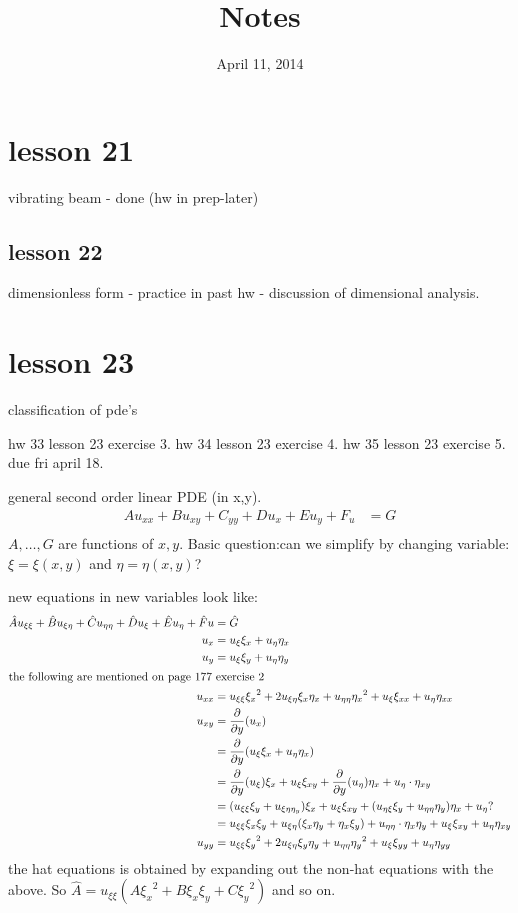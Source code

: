 \documentclass{article}
\begin{document}
\title{Notes}
\date{April 11, 2014}
\maketitle
\section*{lesson 21}
vibrating beam - done (hw in prep-later)

\subsection*{lesson 22}
dimensionless form - practice in past hw - discussion of dimensional analysis.

\section*{lesson 23}
classification of pde's

hw 33 lesson  23 exercise 3. hw 34 lesson 23 exercise 4. hw 35 lesson 23 exercise 5. due fri april 18.

general second order linear PDE (in x,y).
\begin{align*}
  Au_{xx}+Bu_{xy}+C_{yy}+Du_{x}+Eu_y+F_u&=G\\
\end{align*}
$A,\dots,G$ are functions of $x,y$. Basic question:can we simplify by changing variable:$\xi=\xi(x,y)$ and $\eta=\eta(x,y)$?

new equations in new variables look like:
\begin{align*}
  \hat{A}u_{\xi\xi}+\hat{B}u_{\xi\eta}+\hat{C}u_{\eta\eta}+\hat{D}u_{\xi}+\hat{E}u_{\eta}+\hat{F}u&=\hat{G}\\
  u_x&=u_\xi\xi_x+u_\eta\eta_x\\
  u_y&=u_\xi\xi_y+u_\eta\eta_y\\
  \intertext{the following are mentioned on page 177 exercise 2}
  u_{xx}&=u_{\xi\xi}{\xi_x}^2+2u_{\xi\eta}\xi_x\eta_x+u_{\eta\eta}{\eta_x}^2+u_\xi\xi_{xx}+u_\eta\eta_{xx}\\
  u_{xy}&=\frac{\partial }{\partial y}(u_x)\\
  &=\frac{\partial }{\partial y}(u_\xi\xi_x+u_\eta\eta_x)\\
  &=\frac{\partial }{\partial y}(u_\xi)\xi_x+u_\xi\xi_{xy}+\frac{\partial }{\partial y}(u_\eta)\eta_x+u_\eta\cdot\eta_{xy}\\
  &=(u_{\xi\xi}\xi_y+u_{\xi \eta\eta_y})\xi_x+u_\xi\xi_{xy}+(u_{\eta\xi}\xi_y+u_{\eta\eta}\eta_y)\eta_x+u_\eta?\\
  &=u_{\xi\xi}\xi_x\xi_y+u_{\xi\eta}(\xi_x\eta_y+\eta_x\xi_y)+u_{\eta\eta}\cdot\eta_x\eta_y+u_\xi\xi_{xy}+u_\eta\eta_{xy}\\
  u_{yy}&=u_{\xi\xi}{\xi_y}^2+2u_{\xi\eta}\xi_y\eta_y+u_{\eta\eta}{\eta_y}^2+u_\xi\xi_{yy}+u_\eta\eta_{yy}\\
\end{align*}
the hat equations is obtained by expanding out the non-hat equations with the above. So $\hat{A}=u_{\xi\xi}(A{\xi_x}^2+B\xi_x\xi_y+C{\xi_y}^2)$ and so on.
\end{document}
